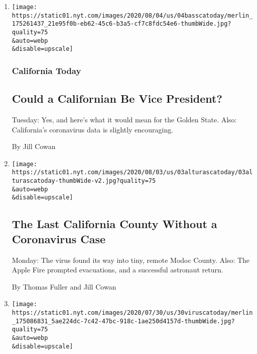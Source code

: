 \begin{enumerate}
\def\labelenumi{\arabic{enumi}.}
\item
  \href{/2020/08/04/us/biden-vp-karen-bass-kamala-harris.html}{}

  \texttt{[image: https://static01.nyt.com/images/2020/08/04/us/04basscatoday/merlin\_175261437\_21e95f0b-eb62-45c6-b3a5-cf7c8fdc54e6-thumbWide.jpg?quality=75\\\&auto=webp\\\&disable=upscale]}

  \hypertarget{california-today}{%
  \subsubsection{California Today}\label{california-today}}

  \hypertarget{could-a-californian-be-vice-president}{%
  \subsection{Could a Californian Be Vice
  President?}\label{could-a-californian-be-vice-president}}

  Tuesday: Yes, and here's what it would mean for the Golden State.
  Also: California's coronavirus data is slightly encouraging.

  By Jill Cowan
\item
  \href{/2020/08/03/us/california-coronavirus-modoc-county.html}{}

  \texttt{[image: https://static01.nyt.com/images/2020/08/03/us/03alturascatoday/03alturascatoday-thumbWide-v2.jpg?quality=75\\\&auto=webp\\\&disable=upscale]}

  \hypertarget{the-last-california-county-without-a-coronavirus-case}{%
  \subsection{The Last California County Without a Coronavirus
  Case}\label{the-last-california-county-without-a-coronavirus-case}}

  Monday: The virus found its way into tiny, remote Modoc County. Also:
  The Apple Fire prompted evacuations, and a successful astronaut
  return.

  By Thomas Fuller and Jill Cowan
\item
  \href{/2020/07/30/us/coronavirus-california-health-equity.html}{}

  \texttt{[image: https://static01.nyt.com/images/2020/07/30/us/30viruscatoday/merlin\_175086831\_5ae224dc-7c42-47bc-918c-1ae250d4157d-thumbWide.jpg?quality=75\\\&auto=webp\\\&disable=upscale]}


\end{enumerate}
